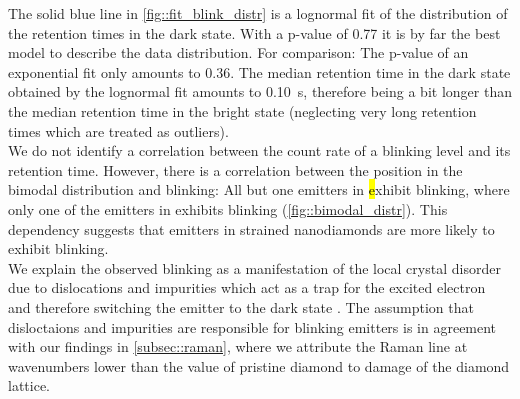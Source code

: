 	The solid blue line in \autoref{fig::fit_blink_distr} is a lognormal fit of the distribution of the retention times in the dark state.
	With a p-value of \num{0.77} it is by far the best model to describe the data distribution.
	For comparison: The p-value of an exponential fit only amounts to \num{0.36}.
	The median retention time in the dark state obtained by the lognormal fit amounts to \SI{0.10}{s}, therefore being a bit longer than the median retention time in the bright state (neglecting very long retention times which are treated as outliers).
	\\
	We do not identify a correlation between the count rate of a blinking level and its retention time.
	However, there is a correlation between the position in the bimodal distribution and blinking: 
	All but one emitters in \hl exhibit blinking, where only one of the emitters in \vl exhibits blinking (\autoref{fig::bimodal_distr}).
	This dependency suggests that emitters in strained nanodiamonds are more likely to exhibit blinking.
	\\
	We explain the observed blinking as a manifestation of the local crystal disorder due to dislocations and impurities which act as a trap for the excited electron and therefore switching the emitter to the dark state \cite{Bradac2010}.
	The assumption that disloctaions and impurities are responsible for blinking emitters is in agreement with our findings in \ref{subsec::raman}, where we attribute the Raman line at wavenumbers lower than the value of pristine diamond to damage of the diamond lattice.